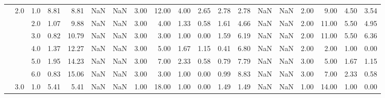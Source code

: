 \begin{tabular}{lllrrrrrrrrrrrrrrrr}
       & 2.0 & 1.0  &      8.81 &       8.81 &               NaN &                NaN &  3.00 &  12.00 &             4.00 &                         2.65 &      2.78 &       2.78 &               NaN &                NaN & 2.00 &   9.00 &             4.50 &                         3.54 \\
       &     & 2.0  &      1.07 &       9.88 &               NaN &                NaN &  3.00 &   4.00 &             1.33 &                         0.58 &      1.61 &       4.66 &               NaN &                NaN & 2.00 &  11.00 &             5.50 &                         4.95 \\
       &     & 3.0  &      0.82 &      10.79 &               NaN &                NaN &  3.00 &   3.00 &             1.00 &                         0.00 &      1.59 &       6.19 &               NaN &                NaN & 2.00 &  11.00 &             5.50 &                         6.36 \\
       &     & 4.0  &      1.37 &      12.27 &               NaN &                NaN &  3.00 &   5.00 &             1.67 &                         1.15 &      0.41 &       6.80 &               NaN &                NaN & 2.00 &   2.00 &             1.00 &                         0.00 \\
       &     & 5.0  &      1.95 &      14.23 &               NaN &                NaN &  3.00 &   7.00 &             2.33 &                         0.58 &      0.79 &       7.79 &               NaN &                NaN & 3.00 &   5.00 &             1.67 &                         1.15 \\
       &     & 6.0  &      0.83 &      15.06 &               NaN &                NaN &  3.00 &   3.00 &             1.00 &                         0.00 &      0.99 &       8.83 &               NaN &                NaN & 3.00 &   7.00 &             2.33 &                         0.58 \\
       & 3.0 & 1.0  &      5.41 &       5.41 &               NaN &                NaN &  1.00 &  18.00 &             1.00 &                         0.00 &      1.49 &       1.49 &               NaN &                NaN & 1.00 &  14.00 &             1.00 &                         0.00 \\
\bottomrule
\end{tabular}
